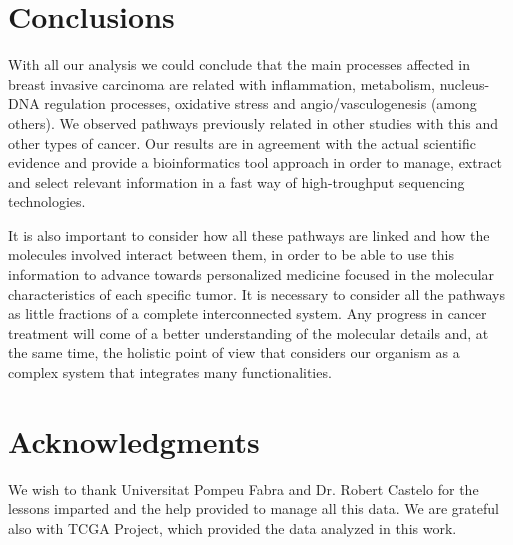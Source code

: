 \documentclass[9pt,twocolumn,twoside]{gsajnl}
\begin{document}
\section*{Conclusions}
With all our analysis we could conclude that the main processes affected in breast invasive carcinoma are related with inflammation, metabolism, nucleus-DNA regulation processes, oxidative stress and angio/vasculogenesis (among others). We observed pathways previously related in other studies with this and other types of cancer. Our results are in agreement with the actual scientific evidence and provide a bioinformatics tool approach in order to manage, extract and select relevant information in a fast way of high-troughput sequencing technologies.
\vspace{2mm}

It is also important to consider how all these pathways are linked and how the molecules involved interact between them, in order to be able to use this information to advance towards personalized medicine focused in the molecular characteristics of each specific tumor. It is necessary to consider all the pathways as little fractions of a complete interconnected system. Any progress in cancer treatment will come of a better understanding of the molecular details and, at the same time, the holistic point of view that considers our organism as a complex system that integrates many functionalities.

\section*{Acknowledgments}
We wish to thank Universitat Pompeu Fabra and Dr. Robert Castelo for the lessons imparted and the help provided to manage all this data. We are grateful also with TCGA Project, which provided the data analyzed in this work.


\end{document}
